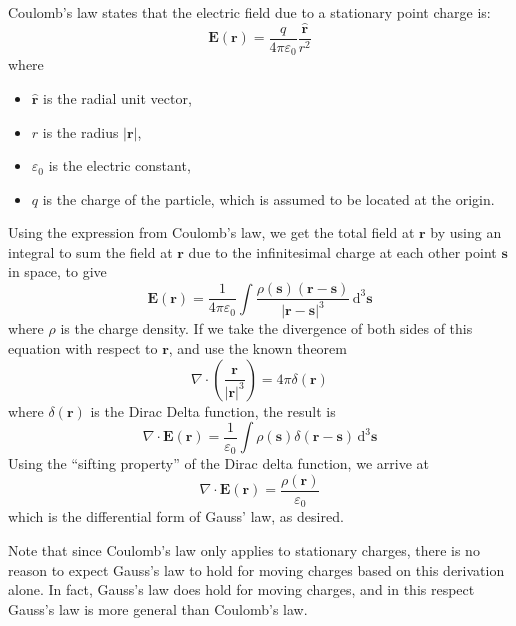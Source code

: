 \documentclass[a4paper]{article}
\begin{document}
\begin{mdframed}[%
    style=mystyle,%
    frametitle={Outline of proof}]

Coulomb's law states that the electric field due to a stationary point charge is: 
\[
    \mathbf{E}(\mathbf{r}) = \frac{q}{4 \pi \varepsilon_0} \frac{\hat{\mathbf{r}}}{r^2}
\]
where
\begin{itemize}[noitemsep]
    \item \(\hat{\mathbf{r}}\) is the radial unit vector,
    \item \(r\) is the radius \(|\mathbf{r}|\),
    \item \(\varepsilon_0\) is the electric constant,
    \item \(q\) is the charge of the particle, which is assumed to be located at the origin.
\end{itemize}

Using the expression from Coulomb's law, we get the total field at \(\mathbf{r}\) by using an integral to sum the field at \(\mathbf{r}\) due to the infinitesimal charge at each other point \(\mathbf{s}\) in space, to give 
\[
    \mathbf{E}(\mathbf{r}) = \frac{1}{4 \pi \varepsilon_0} 
        \int \frac{\rho(\mathbf{s})(\mathbf{r} - \mathbf{s})}{|\mathbf{r} - \mathbf{s}|^3}
            \, \mathrm{d}^{3}\mathbf{s}
\]
where \(\rho\) is the charge density. If we take the divergence of both sides of this equation with respect to \(\mathbf{r}\), and use the known theorem
\[
    \nabla \cdot \left ( \frac{\mathbf{r}}{|\mathbf{r}|^3} \right ) = 4\pi \delta(\mathbf{r})
\]
where \(\delta(\mathbf{r})\) is the Dirac Delta function, the result is
\[
    \nabla \cdot \mathbf{E}(\mathbf{r}) 
    = \frac{1}{\varepsilon_0} \int \rho(\mathbf{s}) 
        \delta (\mathbf{r} - \mathbf{s}) \, \mathrm{d}^{3}\mathbf{s}
\]
Using the ``sifting property'' of the Dirac delta function, we arrive at 
\[
    \nabla \cdot \mathbf{E}(\mathbf{r}) = \frac{\rho(\mathbf{r})}{\varepsilon_0}
\]
which is the differential form of Gauss' law, as desired.
\end{mdframed}
Note that since Coulomb's law only applies to stationary charges, there is no reason to expect Gauss's law to hold for moving charges based on this derivation alone. In fact, Gauss's law does hold for moving charges, and in this respect Gauss's law is more general than Coulomb's law. 
\end{document}
